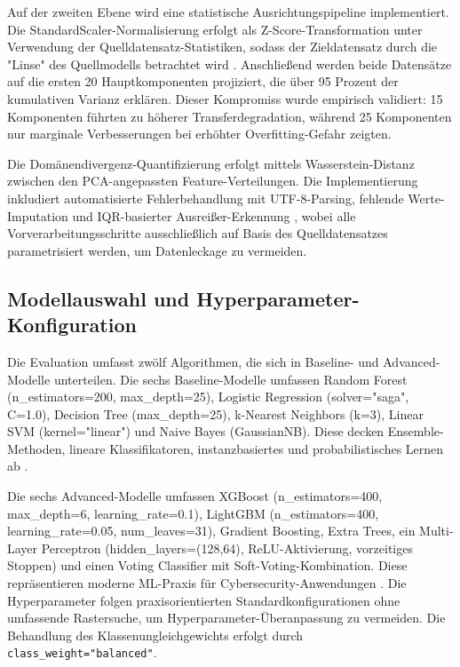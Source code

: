\documentclass[11pt,a4paper]{article}
\begin{document}
    Auf der zweiten Ebene wird eine statistische Ausrichtungspipeline implementiert. Die StandardScaler-Normalisierung erfolgt als Z-Score-Transformation unter Verwendung der Quelldatensatz-Statistiken, sodass der Zieldatensatz durch die "Linse" des Quellmodells betrachtet wird \parencite{Goodfellow2016}. Anschließend werden beide Datensätze auf die ersten 20 Hauptkomponenten projiziert, die über 95 Prozent der kumulativen Varianz erklären. Dieser Kompromiss wurde empirisch validiert: 15 Komponenten führten zu höherer Transferdegradation, während 25 Komponenten nur marginale Verbesserungen bei erhöhter Overfitting-Gefahr zeigten.

    Die Domänendivergenz-Quantifizierung erfolgt mittels Wasserstein-Distanz zwischen den PCA-angepassten Feature-Verteilungen. Die Implementierung inkludiert automatisierte Fehlerbehandlung mit UTF-8-Parsing, fehlende Werte-Imputation und IQR-basierter Ausreißer-Erkennung \parencite{Hastie2009}, wobei alle Vorverarbeitungsschritte ausschließlich auf Basis des Quelldatensatzes parametrisiert werden, um Datenleckage zu vermeiden.


    \subsection{Modellauswahl und Hyperparameter-Konfiguration}

    Die Evaluation umfasst zwölf Algorithmen, die sich in Baseline- und Advanced-Modelle unterteilen. Die sechs Baseline-Modelle umfassen Random Forest (n\_estimators=200, max\_depth=25), Logistic Regression (solver="saga", C=1.0), Decision Tree (max\_depth=25), k-Nearest Neighbors (k=3), Linear SVM (kernel="linear") und Naive Bayes (GaussianNB). Diese decken Ensemble-Methoden, lineare Klassifikatoren, instanzbasiertes und probabilistisches Lernen ab \parencite{Hastie2009}.

    Die sechs Advanced-Modelle umfassen XGBoost (n\_estimators=400, max\_depth=6, learning\_rate=0.1), LightGBM (n\_estimators=400, learning\_rate=0.05, num\_leaves=31), Gradient Boosting, Extra Trees, ein Multi-Layer Perceptron (hidden\_layers=(128,64), ReLU-Aktivierung, vorzeitiges Stoppen) und einen Voting Classifier mit Soft-Voting-Kombination. Diese repräsentieren moderne ML-Praxis für Cybersecurity-Anwendungen \parencite{Vinayakumar2019}. Die Hyperparameter folgen praxisorientierten Standardkonfigurationen ohne umfassende Rastersuche, um Hyperparameter-Überanpassung zu vermeiden. Die Behandlung des Klassenungleichgewichts erfolgt durch \texttt{class\_weight="balanced"}.
\end{document}
